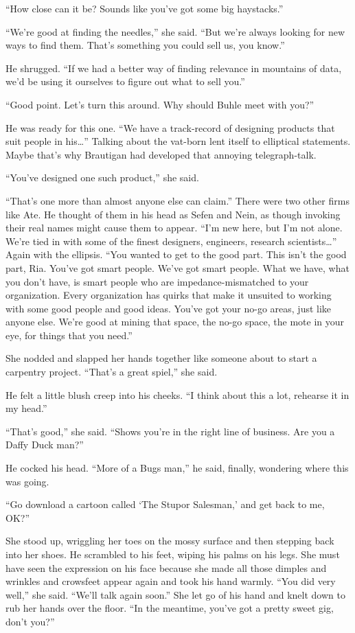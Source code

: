 “How close can it be? Sounds like you've got some big haystacks.”

“We're good at finding the needles,” she said. “But we're always 
looking for new ways to find them. That's something you could sell us, 
you know.”

He shrugged. “If we had a better way of finding relevance in 
mountains of data, we'd be using it ourselves to figure out what to 
sell you.”

“Good point. Let's turn this around. Why should Buhle meet with 
you?”

He was ready for this one. “We have a track-record of designing 
products that suit people in his\ldots{}” Talking about the vat-born lent 
itself to elliptical statements. Maybe that's why Brautigan had 
developed that annoying telegraph-talk.

“You've designed one such product,” she said.

“That's one more than almost anyone else can claim.” There were two 
other firms like Ate. He thought of them in his head as Sefen and Nein, 
as though invoking their real names might cause them to appear. “I'm 
new here, but I'm not alone. We're tied in with some of the finest 
designers, engineers, research scientists\ldots{}” Again with the 
ellipsis. “You wanted to get to the good part. This isn't the good 
part, Ria. You've got smart people. We've got smart people. What we 
have, what you don't have, is smart people who are impedance-mismatched 
to your organization. Every organization has quirks that make it 
unsuited to working with some good people and good ideas. You've got 
your no-go areas, just like anyone else. We're good at mining that 
space, the no-go space, the mote in your eye, for things that you 
need.”

She nodded and slapped her hands together like someone about to start a 
carpentry project. “That's a great spiel,” she said.

He felt a little blush creep into his cheeks. “I think about this a 
lot, rehearse it in my head.”

“That's good,” she said. “Shows you're in the right line of 
business. Are you a Daffy Duck man?”

He cocked his head. “More of a Bugs man,” he said, finally, 
wondering where this was going.

“Go download a cartoon called `The Stupor Salesman,' and get back to 
me, OK?”

She stood up, wriggling her toes on the mossy surface and then stepping 
back into her shoes. He scrambled to his feet, wiping his palms on his 
legs. She must have seen the expression on his face because she made 
all those dimples and wrinkles and crowsfeet appear again and took his 
hand warmly. “You did very well,” she said. “We'll talk again 
soon.” She let go of his hand and knelt down to rub her hands over 
the floor. “In the meantime, you've got a pretty sweet gig, don't 
you?”


